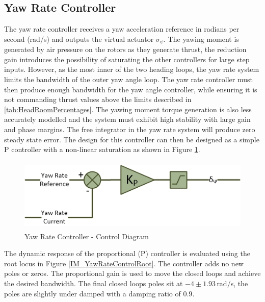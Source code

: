 	\subsection{Yaw Rate Controller}	
	The yaw rate controller receives a yaw acceleration reference in radians per second (rad/s) and outputs the virtual actuator $\sigma_{\psi}$. The yawing moment is generated by air pressure on the rotors as they generate thrust, the reduction gain introduces the possibility of saturating the other controllers for large step inputs. However, as the most inner of the two heading loops, the yaw rate system limits the bandwidth of the outer yaw angle loop. The yaw rate controller must then produce enough bandwidth for the yaw angle controller, while ensuring it is not commanding thrust values above the limits described in \ref{tab:HeadRoomPercentages}. The yawing moment torque generation is also less accurately modelled  and the system must exhibit high stability with large gain and phase margins. The free integrator in the yaw rate system will produce zero steady state error. The design for this controller can then be designed as a simple P controller with a non-linear saturation as shown in Figure \ref{IM_YawRateController}.
	
	\begin{figure}[H]
		\centering
		\includegraphics[height = 3.5cm]{../References/Diagrams/YawRateController.jpg}
		\caption{Yaw Rate Controller -  Control Diagram}
		\label{IM_YawRateController}
	\end{figure}
	
	The dynamic response of the proportional (P) controller is evaluated using the root locus in Figure \ref{IM_YawRateControlRoot}. The controller adds no new poles or zeros. The proportional gain is used to move the closed loops and achieve the desired bandwidth. The final closed loops poles sit at $-4 \pm 1.93$\,rad/s, the poles are slightly under damped with a damping ratio of $0.9$.
	

